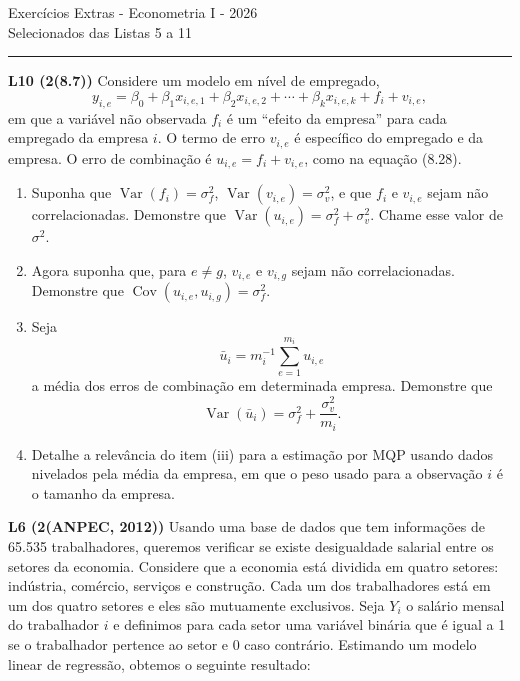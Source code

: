 \documentclass[12pt,letterpaper,onecolumn]{exam}
\begin{document}
\begingroup
    \centering
    \LARGE Exercícios Extras - Econometria I - 2026\\[0.5em]
    \large Selecionados das Listas 5 a 11 \par
\endgroup
\rule{\textwidth}{0.4pt}

\begin{questions}

\question \textbf{L10 (2(8.7))} Considere um modelo em nível de empregado,
\[
y_{i,e} = \beta_0 + \beta_1 x_{i,e,1} + \beta_2 x_{i,e,2} + \cdots + \beta_k x_{i,e,k} + f_i + v_{i,e},
\]
em que a variável não observada \(f_i\) é um ``efeito da empresa'' para cada empregado da empresa \(i\). O termo de erro \(v_{i,e}\) é específico do empregado e da empresa. O erro de combinação é \(u_{i,e} = f_i + v_{i,e}\), como na equação (8.28).
\begin{enumerate}[label=(\roman*)]
    \item Suponha que \(\operatorname{Var}(f_i)=\sigma_f^2\), \(\operatorname{Var}(v_{i,e})=\sigma_v^2\), e que \(f_i\) e \(v_{i,e}\) sejam não correlacionadas. Demonstre que \(\operatorname{Var}(u_{i,e})=\sigma_f^2+\sigma_v^2\). Chame esse valor de \(\sigma^2\).
    \item Agora suponha que, para \(e \neq g\), \(v_{i,e}\) e \(v_{i,g}\) sejam não correlacionadas. Demonstre que \(\operatorname{Cov}(u_{i,e},u_{i,g})=\sigma_f^2\).
    \item Seja
    \[
    \bar{u}_i = m_i^{-1}\sum_{e=1}^{m_i} u_{i,e}
    \]
    a média dos erros de combinação em determinada empresa. Demonstre que
    \[
    \operatorname{Var}(\bar{u}_i)=\sigma_f^2+\frac{\sigma_v^2}{m_i}.
    \]
    \item Detalhe a relevância do item (iii) para a estimação por MQP usando dados nivelados pela média da empresa, em que o peso usado para a observação \(i\) é o tamanho da empresa.
\end{enumerate}

\vspace{0.7cm}

\question \textbf{L6 (2(ANPEC, 2012))} Usando uma base de dados que tem informações de 65.535 trabalhadores, queremos verificar se existe desigualdade salarial entre os setores da economia. Considere que a economia está dividida em quatro setores: indústria, comércio, serviços e construção. Cada um dos trabalhadores está em um dos quatro setores e eles são mutuamente exclusivos. Seja \(Y_i\) o salário mensal do trabalhador \(i\) e definimos para cada setor uma variável binária que é igual a 1 se o trabalhador pertence ao setor e 0 caso contrário. Estimando um modelo linear de regressão, obtemos o seguinte resultado:


\end{questions}
\end{document}
